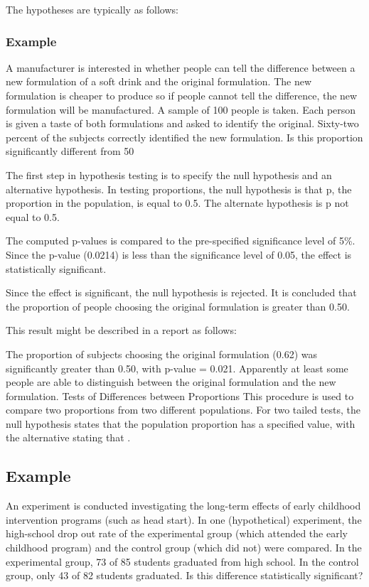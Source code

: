 The hypotheses are typically as follows:

\subsubsection{Example}
A manufacturer is interested in whether people can tell the difference between a new formulation of a soft drink and the original formulation. The new formulation is cheaper to produce so if people cannot tell the difference, the new formulation will be manufactured. A sample of 100 people is taken. Each person is given a taste of both formulations and asked to identify the original. Sixty-two percent of the subjects correctly identified the new formulation. Is this proportion significantly different from 50%

The first step in hypothesis testing is to specify the null hypothesis and an alternative hypothesis. In testing proportions, the null hypothesis is that p, the proportion in the population, is equal to 0.5. The alternate hypothesis is p not equal to 0.5.

The computed p-values is compared to the pre-specified significance level of 5\%. Since the p-value (0.0214) is less than the significance level of 0.05, the effect is statistically significant.

Since the effect is significant, the null hypothesis is rejected. It is concluded that the proportion of people choosing the original formulation is greater than 0.50.

This result might be described in a report as follows:

    The proportion of subjects choosing the original formulation (0.62) was significantly greater than 0.50, with p-value = 0.021.
    Apparently at least some people are able to distinguish between the original formulation and the new formulation.
Tests of Differences between Proportions
This procedure is used to compare two proportions from two different populations. For two tailed tests, the null hypothesis states that the population proportion  has a specified value, with the alternative stating that .

\subsection{Example}
An experiment is conducted investigating the long-term effects of early childhood intervention programs (such as head start). In one (hypothetical) experiment, the high-school drop out rate of the experimental group (which attended the early childhood program) and the control group (which did not) were compared. In the experimental group, 73 of 85 students graduated from high school. In the control group, only 43 of 82 students graduated. Is this difference statistically significant?

